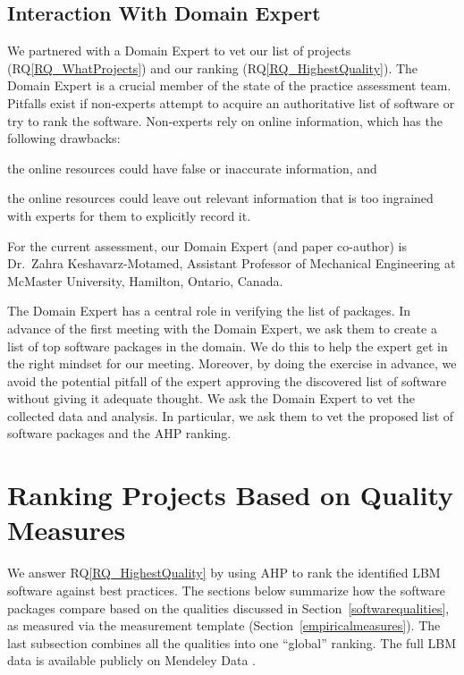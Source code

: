 \documentclass[final, 3p, times, authoryear]{elsarticle}
\newcommand{\rqref}[1]{RQ\ref{#1}}
\begin{document}
\subsection{Interaction With Domain Expert} \label{sec_vet_software_list}

We partnered with a Domain Expert to vet our list of projects
(\rqref{RQ_WhatProjects}) and our ranking (\rqref{RQ_HighestQuality}). The
Domain Expert is a crucial member of the state of the practice assessment team.
Pitfalls exist if non-experts attempt to acquire an authoritative list of
software or try to rank the software. Non-experts rely on online information,
which has the following drawbacks:
\begin{inparaenum}[i)]
  \item the online resources could have false or inaccurate information, and 
  \item the online resources could leave out relevant information that is too
  ingrained with experts for them to explicitly record it.
\end{inparaenum}
For the current assessment, our Domain Expert (and paper co-author) is Dr.\
 Zahra Keshavarz-Motamed, Assistant Professor of Mechanical Engineering at
McMaster University, Hamilton, Ontario, Canada.  

The Domain Expert has a central role in verifying the list of packages. In
advance of the first meeting with the Domain Expert, we ask them to create a
list of top software packages in the domain.  We do this to help the expert get
in the right mindset for our meeting.  Moreover, by doing the exercise in
advance, we avoid the potential pitfall of the expert approving the discovered
list of software without giving it adequate thought. We ask the Domain Expert to
vet the collected data and analysis. In particular, we ask them to vet the
proposed list of software packages and the AHP ranking.

\section{Ranking Projects Based on Quality Measures} \label{AHPresults}

We answer \rqref{RQ_HighestQuality} by using AHP to rank the identified LBM
software against best practices.  The sections below summarize how the software
packages compare based on the qualities discussed in
Section~\ref{softwarequalities}, as measured via the measurement template
(Section~\ref{empiricalmeasures}).  The last subsection combines all the
qualities into one ``global'' ranking.  The full LBM data is available publicly
on Mendeley Data \citep{Smith2022}. %
\end{document}
